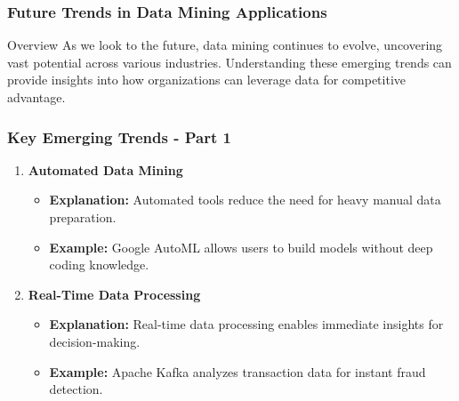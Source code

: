 \documentclass[aspectratio=169]{beamer}
\begin{document}
\begin{frame}[fragile]
    \frametitle{Future Trends in Data Mining Applications}
    \begin{block}{Overview}
        As we look to the future, data mining continues to evolve, uncovering vast potential across various industries. 
        Understanding these emerging trends can provide insights into how organizations can leverage data for competitive advantage.
    \end{block}
\end{frame}

\begin{frame}[fragile]
    \frametitle{Key Emerging Trends - Part 1}
    \begin{enumerate}
        \item \textbf{Automated Data Mining}
            \begin{itemize}
                \item \textbf{Explanation:} Automated tools reduce the need for heavy manual data preparation.
                \item \textbf{Example:} Google AutoML allows users to build models without deep coding knowledge.
            \end{itemize}
        
        \item \textbf{Real-Time Data Processing}
            \begin{itemize}
                \item \textbf{Explanation:} Real-time data processing enables immediate insights for decision-making.
                \item \textbf{Example:} Apache Kafka analyzes transaction data for instant fraud detection.
            \end{itemize}
    \end{enumerate}
\end{frame}
\end{document}
